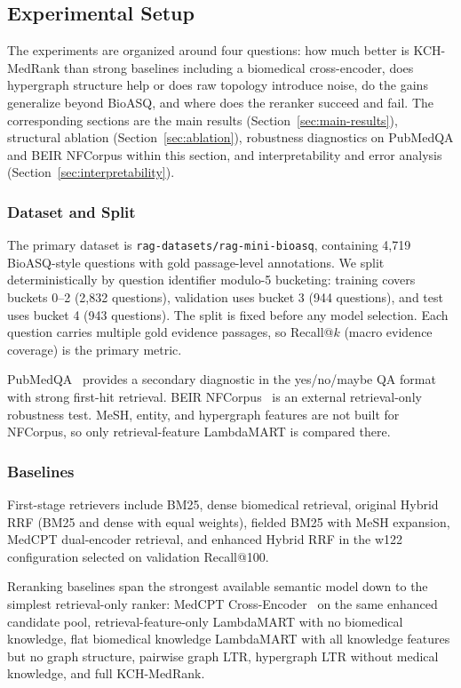 \subsection{Experimental Setup}

The experiments are organized around four questions: how much better is KCH-MedRank than strong baselines including a biomedical cross-encoder, does hypergraph structure help or does raw topology introduce noise, do the gains generalize beyond BioASQ, and where does the reranker succeed and fail. The corresponding sections are the main results (Section~\ref{sec:main-results}), structural ablation (Section~\ref{sec:ablation}), robustness diagnostics on PubMedQA and BEIR NFCorpus within this section, and interpretability and error analysis (Section~\ref{sec:interpretability}).

\subsubsection{Dataset and Split}

The primary dataset is \texttt{rag-datasets/rag-mini-bioasq}, containing 4,719 BioASQ-style questions with gold passage-level annotations. We split deterministically by question identifier modulo-5 bucketing: training covers buckets 0--2 (2,832 questions), validation uses bucket 3 (944 questions), and test uses bucket 4 (943 questions). The split is fixed before any model selection. Each question carries multiple gold evidence passages, so Recall@$k$ (macro evidence coverage) is the primary metric.

PubMedQA~\citep{jin2019pubmedqa} provides a secondary diagnostic in the yes/no/maybe QA format with strong first-hit retrieval. BEIR NFCorpus~\citep{thakur2021beir} is an external retrieval-only robustness test. MeSH, entity, and hypergraph features are not built for NFCorpus, so only retrieval-feature LambdaMART is compared there.

\subsubsection{Baselines}

First-stage retrievers include BM25, dense biomedical retrieval, original Hybrid RRF (BM25 and dense with equal weights), fielded BM25 with MeSH expansion, MedCPT dual-encoder retrieval, and enhanced Hybrid RRF in the w122 configuration selected on validation Recall@100.

Reranking baselines span the strongest available semantic model down to the simplest retrieval-only ranker: MedCPT Cross-Encoder~\citep{jin2023medcpt} on the same enhanced candidate pool, retrieval-feature-only LambdaMART with no biomedical knowledge, flat biomedical knowledge LambdaMART with all knowledge features but no graph structure, pairwise graph LTR, hypergraph LTR without medical knowledge, and full KCH-MedRank.

